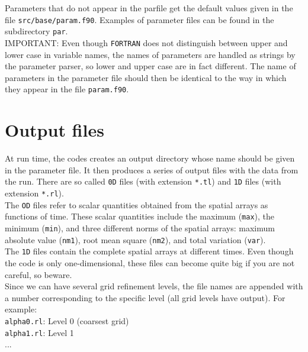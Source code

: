 \documentclass[12pt]{article}
\begin{document}
Parameters that do not appear in the parfile get the default values
given in the file \texttt{src/base/param.f90}.  Examples of parameter files can
be found in the subdirectory \texttt{par}. \\

IMPORTANT: Even though \texttt{FORTRAN} does not distinguish between
upper and lower case in variable names, the names of parameters are
handled as strings by the parameter parser, so lower and upper case
are in fact different.  The name of parameters in the parameter file
should then be identical to the way in which they appear in the file
\texttt{param.f90}. \\



\section{Output files}

At run time, the codes creates an output directory whose name
should be given in the parameter file. It then produces a series of
output files with the data from the run. There are so called
\texttt{0D} files (with extension \texttt{*.tl}) and \texttt{1D} files
  (with extension \texttt{*.rl}). \\

The \texttt{OD} files refer to scalar quantities obtained from the
spatial arrays as functions of time. These scalar quantities include
the maximum (\texttt{max}), the minimum (\texttt{min}), and three
different norms of the spatial arrays: maximum absolute value
(\texttt{nm1}), root mean square (\texttt{nm2}), and total variation
(\texttt{var}). \\

The \texttt{1D} files contain the complete spatial arrays at different
times.  Even though the code is only one-dimensional, these files can
become quite big if you are not careful, so beware. \\

Since we can have several grid refinement levels, the file names are
appended with a number corresponding to the specific level (all grid
levels have output). For example: \\

\texttt{alpha0.rl}: \hspace{5mm} Level 0 (coarsest grid) \\
\texttt{alpha1.rl}: \hspace{5mm} Level 1 \\
... \\
\end{document}
